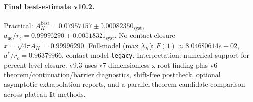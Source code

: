 \paragraph{Final best-estimate v10.2.}
Practical: $A_K^{\mathrm{best}} = 0.07957157 \pm 0.00082350_{\mathrm{syst}}$, $a_{\mathrm{nc}}/r_c = 0.99996290 \pm 0.00518321_{\mathrm{syst}}$.
No-contact closure $x = \sqrt{4\pi A_K} = 0.99996290$.
Full-model (max $\lambda_K$): $F(1) \approx 8.04680614e-02$, $a^*/r_c = 0.96379966$, contact model \texttt{legacy}.
Interpretation: numerical support for percent-level closure; v9.3 uses v7 dimensionless-x root finding plus v6 theorem/continuation/barrier diagnostics, shift-free postcheck, optional asymptotic extrapolation reports, and a parallel theorem-candidate comparison across plateau fit methods.
